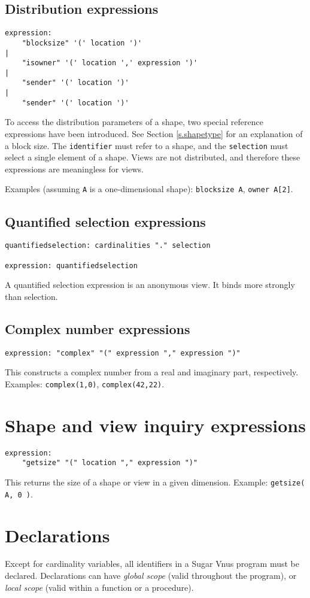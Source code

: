 \documentclass[a4paper]{article}
\newcommand{\langnm}{Sugar Vnus}
\newcommand{\defn}[1]{{\em #1}\index{#1}}
\begin{document}
\subsection{Distribution expressions}
\begin{verbatim}
expression:
    "blocksize" '(' location ')'
|
    "isowner" '(' location ',' expression ')'
|
    "sender" '(' location ')'
|
    "sender" '(' location ')'
\end{verbatim}
To access the distribution parameters of a shape, two special reference
expressions have been introduced. See Section \ref{s.shapetype} for an
explanation of a block size.
The {\tt identifier} must refer to a shape, and the {\tt selection} must
select a single element of a shape.
Views are not distributed, and therefore these expressions are meaningless
for views.
\par
Examples (assuming \verb"A" is a one-dimensional shape):
\verb"blocksize A", \verb"owner A[2]".
\subsection{Quantified selection expressions}
\begin{verbatim}
quantifiedselection: cardinalities "." selection

expression: quantifiedselection
\end{verbatim}
A quantified selection expression is an anonymous view.
It binds more strongly than selection.
\subsection{Complex number expressions}
\begin{verbatim}
expression: "complex" "(" expression "," expression ")"
\end{verbatim}
This constructs a complex number from a real and imaginary part,
respectively.
Examples: \verb"complex(1,0)", \verb"complex(42,22)".

\section{Shape and view inquiry expressions}
\begin{verbatim}
expression:
    "getsize" "(" location "," expression ")"
\end{verbatim}
This returns the size of a shape or view in a given dimension.
Example: \verb"getsize( A, 0 )".

\section{Declarations}
Except for cardinality variables, all identifiers in a
{\langnm} program must be declared.
Declarations can have \defn{global scope} (valid throughout the
program), or \defn{local scope} (valid within a function or
a procedure).
\end{document}
